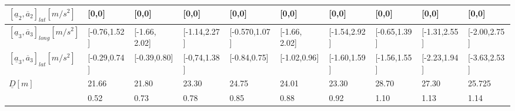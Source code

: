 \begin{enumerate}
\begin{landscape}
\begin{table}[!h]
\begin{adjustwidth}{-0.235\textwidth}{-0.10\textwidth}
\begin{tabular}{|l|lll|lll|lll|}
$[\underline{a}_2,\overline{a}_2]_{lat}[m/s^2]$                   & \multicolumn{1}{l|}{{[}0,0{]}}             & \multicolumn{1}{l|}{{[}0,0{]}}             & {[}0,0{]}                & \multicolumn{1}{l|}{{[}0,0{]}}           & \multicolumn{1}{l|}{{[}0,0{]}}             & {[}0,0{]}                & \multicolumn{1}{l|}{{[}0,0{]}}            & \multicolumn{1}{l|}{{[}0,0{]}}           & {[}0,0{]}            \\ \hline
$[\underline{a}_3,\overline{a}_3]_{long}[m/s^2]$                  & \multicolumn{1}{l|}{{[}-0.76,1.52{]}}  & \multicolumn{1}{l|}{{[}-1.66, 2.02{]}}    & {[}-1.14,2.27{]}      & \multicolumn{1}{l|}{{[}-0.570,1.07{]}}  & \multicolumn{1}{l|}{{[}-1.66, 2.02{]}}    & {[}-1.54,2.92{]}     & \multicolumn{1}{l|}{{[}-0.65,1.39{]}} & \multicolumn{1}{l|}{{[}-1.31,2.55{]}} & {[}-2.00,2.75{]} \\ \hline
$[\underline{a}_3,\overline{a}_3]_{lat}[m/s^2]$                   & \multicolumn{1}{l|}{{[}-0.29,0.74{]}}  & \multicolumn{1}{l|}{{[}-0.39,0.80{]}}  & {[}-0,74,1.38{]}     & \multicolumn{1}{l|}{{[}-0.84,0.75{]}} & \multicolumn{1}{l|}{{[}-1.02,0.96{]}}  & {[}-1.60,1.59{]}       & \multicolumn{1}{l|}{{[}-1.56,1.55{]}}  & \multicolumn{1}{l|}{{[}-2.23,1.94{]}} & {[}-3.63,2.53{]} \\ \hline
$\underline{D}[m]$                                                & \multicolumn{1}{l|}{21.66}               & \multicolumn{1}{l|}{21.80}               & 23.30                  & \multicolumn{1}{l|}{24.75}               & \multicolumn{1}{l|}{24.01}                 & 23.30                  & \multicolumn{1}{l|}{28.70}                & \multicolumn{1}{l|}{27.30}             & 25.725               \\ \hline
{\ul ${Error}_{max}[m]$}                                               & \multicolumn{1}{l|}{{ 0.52}}          & \multicolumn{1}{l|}{0.73}                & { 0.78}             & \multicolumn{1}{l|}{{ 0.85}}        & \multicolumn{1}{l|}{{ 0.88}}          & 0.92                   & \multicolumn{1}{l|}{1.10}               & \multicolumn{1}{l|}{1.13}              & 1.14               \\ \hline
\end{tabular}
\end{adjustwidth}
\end{table}
\end{landscape}









    
\end{enumerate}






